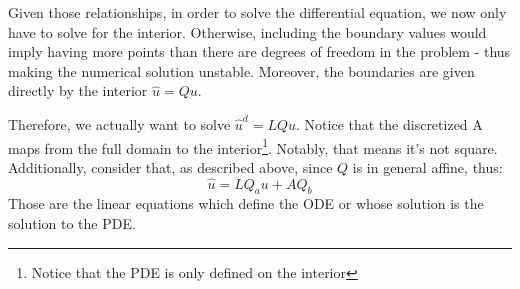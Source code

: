 \documentclass[11pt]{article}
\begin{document}
\begin{itemize}
		
			Given those relationships, in order to solve the differential equation, we now only have to solve for the interior. Otherwise, including the boundary values would imply having more points than there are degrees of freedom in the problem - thus making the numerical solution unstable. Moreover, the boundaries are given directly by the interior $\hat{u} = Qu$. 
		
			Therefore, we actually want to solve $\hat{u}^d = LQu$. Notice that the discretized A maps from the full domain to the interior\footnote{Notice that the PDE is only defined on the interior}. Notably, that means it's not square. Additionally, consider that, as described above, since $Q$ is in general affine, thus:
			\begin{equation}
			\hat{u} = LQ_au + AQ_b
			\end{equation}
			Those are the linear equations which define the ODE or whose solution is the solution to the PDE.
		\end{itemize}	
	
\end{document}
